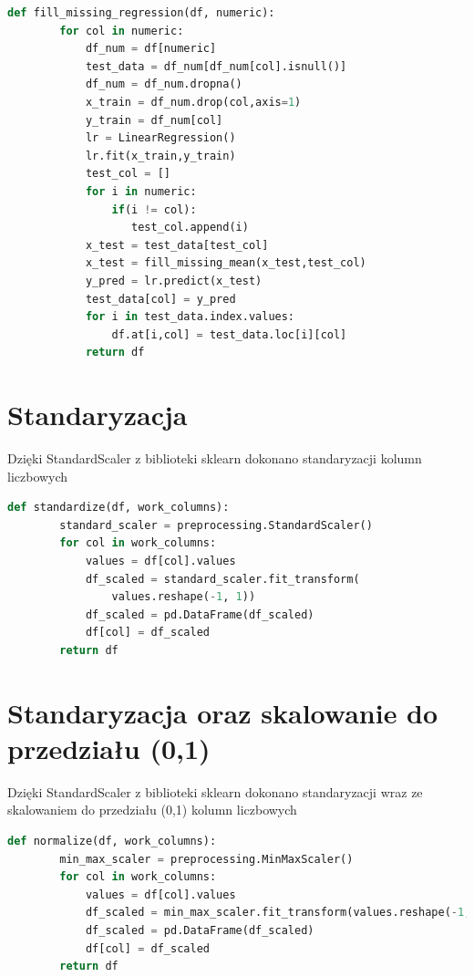 \documentclass{book}
\begin{document}
\begin{lstlisting}[language=Python, caption={Wypełnienie 
    brakujących wartości za pomocą regresji liniowej}, captionpos=b]
    def fill_missing_regression(df, numeric):    
        for col in numeric:
            df_num = df[numeric]
            test_data = df_num[df_num[col].isnull()]
            df_num = df_num.dropna()
            x_train = df_num.drop(col,axis=1)
            y_train = df_num[col]
            lr = LinearRegression()
            lr.fit(x_train,y_train)
            test_col = []
            for i in numeric:
                if(i != col):
                   test_col.append(i)
            x_test = test_data[test_col]
            x_test = fill_missing_mean(x_test,test_col)
            y_pred = lr.predict(x_test)
            test_data[col] = y_pred
            for i in test_data.index.values:
                df.at[i,col] = test_data.loc[i][col]
            return df
\end{lstlisting}

\section{Standaryzacja}
Dzięki StandardScaler z biblioteki sklearn dokonano 
standaryzacji kolumn liczbowych

\begin{lstlisting}[language=Python, caption={Standaryzacja 
    kolumn liczbowych}, captionpos=b]
    def standardize(df, work_columns):
        standard_scaler = preprocessing.StandardScaler()
        for col in work_columns:
            values = df[col].values
            df_scaled = standard_scaler.fit_transform(
                values.reshape(-1, 1)) 
            df_scaled = pd.DataFrame(df_scaled)
            df[col] = df_scaled
        return df
\end{lstlisting}

\section{Standaryzacja oraz skalowanie do przedziału (0,1)}
Dzięki StandardScaler z biblioteki sklearn dokonano 
standaryzacji wraz ze skalowaniem do przedziału (0,1) 
kolumn liczbowych

\begin{lstlisting}[language=Python, caption={Skalowanie do 
    przedziału (0,1)}, captionpos=b]
    def normalize(df, work_columns):
        min_max_scaler = preprocessing.MinMaxScaler()
        for col in work_columns:
            values = df[col].values
            df_scaled = min_max_scaler.fit_transform(values.reshape(-1, 1)) 
            df_scaled = pd.DataFrame(df_scaled)
            df[col] = df_scaled
        return df
\end{lstlisting}
\end{document}
